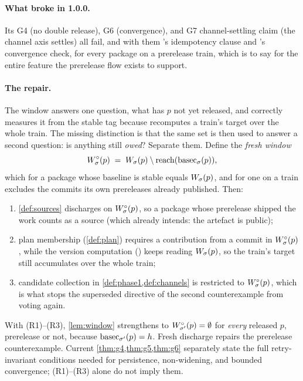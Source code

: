 \paragraph{What broke in 1.0.0.} Its G4 (no double release), G6 (convergence), and G7 channel-settling claim (the channel axis settles) all fail, and with
them 's idempotency clause and
's convergence check, for every package on a prerelease train,
which is to say for the entire feature the prerelease flow exists to support.

\paragraph{The repair.} The window answers one question, what has $p$ not
yet released, and  correctly measures it from the stable tag
because  recomputes a train's target over the whole train. The
missing distinction is that the same set is then used to answer a second
question: is anything still \emph{owed}? Separate them. Define the
\emph{fresh window}
\[
  W^{\circ}_{\sigma}(p) \;=\; W_{\sigma}(p) \setminus \mathrm{reach}(\mathrm{basec}_{\sigma}(p)),
\]
which for a package whose baseline is stable equals $W_{\sigma}(p)$, and for one
on a train excludes the commits its own prereleases already published. Then:
\begin{enumerate}[label=(R\arabic*),leftmargin=3.2em]
  \item \cref{def:sources} discharges on $W^{\circ}_{\sigma}(p)$, so a package whose
    prerelease shipped the work counts as a source (which  already
    intends: the artefact is public);
  \item plan membership (\cref{def:plan}) requires a contribution from a commit
    in $W^{\circ}_{\sigma}(p)$, while the version computation () keeps
    reading $W_{\sigma}(p)$, so the train's target still accumulates over the
    whole train;
  \item candidate collection in \cref{def:phase1,def:channels} is restricted to
    $W^{\circ}_{\sigma}(p)$, which is what stops the superseded directive of the second
    counterexample from voting again.
\end{enumerate}
With (R1)--(R3), \cref{lem:window} strengthens to $W^{\circ}_{\sigma'}(p) = \emptyset$
for \emph{every} released $p$, prerelease or not, because $\mathrm{basec}_{\sigma'}(p) =
h$. Fresh discharge repairs the prerelease counterexample. Current \cref{thm:g4,thm:g5,thm:g6} separately state the full retry-invariant conditions needed for persistence, non-widening, and bounded convergence; (R1)--(R3) alone do not imply them.

